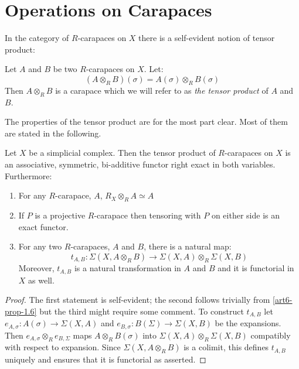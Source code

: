 \section{Operations on Carapaces}

In the category of $R$-carapaces on $X$ there is a self-evident notion of tensor product:

\begin{definition}\label{art6-definition-2.2}
Let $A$ and $B$ be two $R$-carapaces on $X$. Let:
$$
(A \otimes_{R} B)(\sigma) = A(\sigma) \otimes_{R}B(\sigma)
$$
Then $A\otimes_{R}B$ is a carapace which we will refer to as \textit{the tensor product} of $A$ and $B$.

The properties of the tensor product are for the most part clear. Most of them are stated in the following.
\end{definition}

\begin{prop}\label{art6-prop-2.2}
Let $X$ be a simplicial complex. Then the tensor product of $R$-carapaces on $X$ is an associative, symmetric, bi-additive functor right exact in both variables. Furthermore:
   \begin{enumerate}[(1)]
   \item For any $R$-carapace, $A$, $R_{X}\otimes_{R}A \simeq A$\label{art6-prop2.2-enum-(1)}
   \item If $P$ is a projective $R$-carapace then tensoring with $P$ on either side is 
   an exact functor.\label{art6-prop2.2-enum-(2)}
   \item For any two $R$-carapaces, $A$ and $B$, there is a natural map:
      $$
      t_{A, B}:\Sigma(X, A\otimes_{R}B)\rightarrow \Sigma(X, A)\otimes_{R}\Sigma(X, B)
      $$
      Moreover, $t_{A, B}$ is a natural transformation in $A$ and $B$ and it is functorial in $X$ as well.\label{art6-prop2.2-enum-(3)}
   \end{enumerate}
\end{prop}

\begin{proof}
The first statement is self-evident; the second follows trivially from \ref{art6-prop-1.6} but the third might require some comment. To construct $t_{A, B}$ let $e_{A, \sigma} : A(\sigma) \rightarrow \Sigma(X, A)$ and $e_{B, \sigma} : B(\Sigma) \rightarrow \Sigma(X, B)$ be the expansions. Then $e_{A, \sigma} \otimes_{R} e_{B, \Sigma}$ maps $A\otimes_{R} B(\sigma)$ into $\Sigma(X, A) \otimes_{R} \Sigma(X, B)$ compatibly with respect to expansion. Since $\Sigma(X, A \otimes_{R} B)$ is a colimit, this defines $t_{A, B}$ uniquely and ensures that it is functorial as asserted. 
\end{proof}

